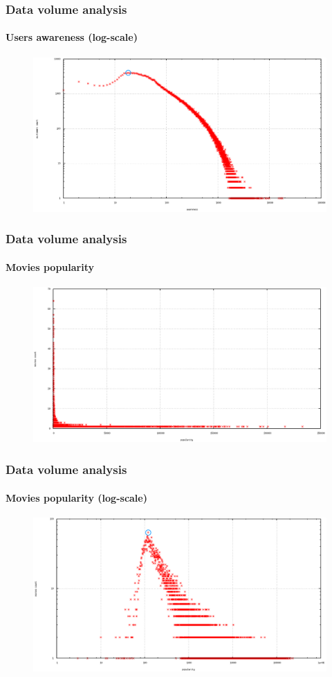 \documentclass{beamer}
\begin{document}
\begin{frame}
\frametitle{Data volume analysis}
\framesubtitle{Users awareness (log-scale)}
\begin{figure}[h] 
    \includegraphics[width=\linewidth]{users_awareness_logscale.png}
\end{figure}
\end{frame}

\begin{frame}
\frametitle{Data volume analysis}
\framesubtitle{Movies popularity}
\begin{figure}[h] 
    \includegraphics[width=\linewidth]{movies_popularity.png}
\end{figure}
\end{frame}

\begin{frame}
\frametitle{Data volume analysis}
\framesubtitle{Movies popularity (log-scale)}
\begin{figure}[h] 
    \includegraphics[width=\linewidth]{movies_popularity_logscale.png}
\end{figure}
\end{frame}
\end{document}
